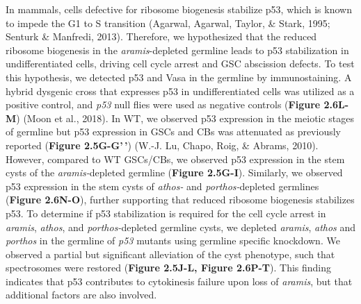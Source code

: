 \documentclass[12pt,oneside]{reedthesis}
\begin{document}
\textbf{\hfill\break
}

In mammals, cells defective for ribosome biogenesis stabilize p53, which is known to impede the G1 to S transition (Agarwal, Agarwal, Taylor, \& Stark, 1995; Senturk \& Manfredi, 2013). Therefore, we hypothesized that the reduced ribosome biogenesis in the \emph{aramis}-depleted germline leads to p53 stabilization in undifferentiated cells, driving cell cycle arrest and GSC abscission defects. To test this hypothesis, we detected p53 and Vasa in the germline by immunostaining. A hybrid dysgenic cross that expresses p53 in undifferentiated cells was utilized as a positive control, and \emph{p53} null flies were used as negative controls (\textbf{Figure 2.6L-M}) (Moon et al., 2018). In WT, we observed p53 expression in the meiotic stages of germline but p53 expression in GSCs and CBs was attenuated as previously reported (\textbf{Figure 2.5G-G'\,'}) (W.-J. Lu, Chapo, Roig, \& Abrams, 2010). However, compared to WT GSCs/CBs, we observed p53 expression in the stem cysts of the \emph{aramis-}depleted germline (\textbf{Figure 2.5G-I}). Similarly, we observed p53 expression in the stem cysts of \emph{athos-} and \emph{porthos-}depleted germlines (\textbf{Figure 2.6N-O}), further supporting that reduced ribosome biogenesis stabilizes p53. To determine if p53 stabilization is required for the cell cycle arrest in \emph{aramis}, \emph{athos}, and \emph{porthos-}depleted germline cysts, we depleted \emph{aramis}, \emph{athos} and \emph{porthos} in the germline of \emph{p53} mutants using germline specific knockdown. We observed a partial but significant alleviation of the cyst phenotype, such that spectrosomes were restored (\textbf{Figure 2.5J-L, Figure 2.6P-T}). This finding indicates that p53 contributes to cytokinesis failure upon loss of \emph{aramis}, but that additional factors are also involved.
\end{document}
